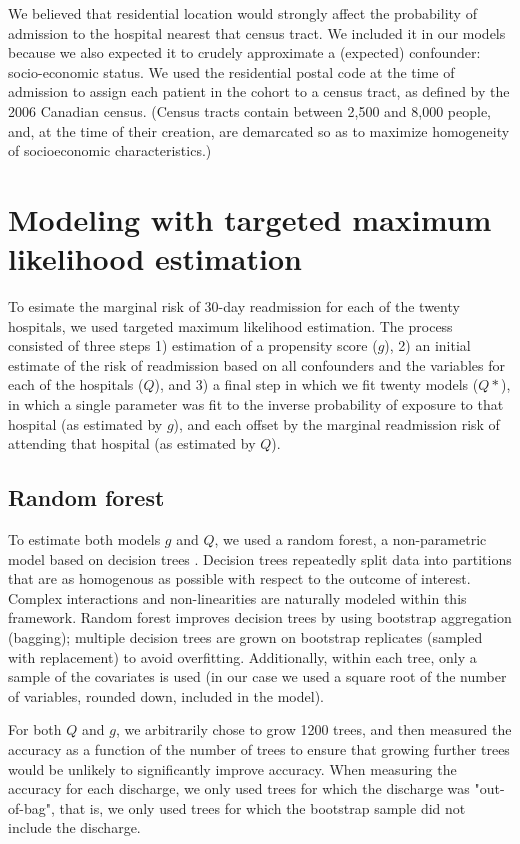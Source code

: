 \documentclass[]{article}\usepackage[]{graphicx}\usepackage[]{color}
\begin{document}
We believed that residential location would strongly affect the probability of admission to the hospital nearest that census tract. We included it in our models because we also expected it to crudely approximate a (expected) confounder: socio-economic status.  We used the residential postal code at the time of admission to assign each patient in the cohort to a census tract, as defined by the 2006 Canadian census. (Census tracts contain between 2,500 and 8,000 people, and, at the time of their creation, are demarcated so as to maximize homogeneity of socioeconomic characteristics.)

\section{Modeling with targeted maximum likelihood estimation}
To esimate the marginal risk of 30-day readmission for each of the twenty hospitals, we used targeted maximum likelihood estimation. The process consisted of three steps 1) estimation of a propensity score ($g$), 2) an initial estimate of the risk of readmission based on all confounders and the variables for each of the hospitals ($Q$), and 3) a final step in which we fit twenty models ($Q*$), in which a single parameter was fit to the inverse probability of exposure to that hospital (as estimated by $g$), and each offset by the marginal readmission risk of attending that hospital (as estimated by $Q$). 

\subsection{Random forest}
To estimate both models $g$ and $Q$, we used a random forest, a non-parametric model based on decision trees \supercite{breiman_random_2001}. Decision trees repeatedly split data into partitions that are as homogenous as possible with respect to the outcome of interest. Complex interactions and non-linearities are naturally modeled within this framework. Random forest improves decision trees by using bootstrap aggregation (bagging); multiple decision trees are grown on bootstrap replicates (sampled with replacement) to avoid overfitting. Additionally, within each tree, only a sample of the covariates is used (in our case we used a square root of the number of variables, rounded down, included in the model).

For both $Q$ and $g$, we arbitrarily chose to grow 1200 trees, and then measured the accuracy as a function of the number of trees to ensure that growing further trees would be unlikely to significantly improve accuracy. When measuring the accuracy for each discharge, we only used trees for which the discharge was "out-of-bag", that is, we only used trees for which the bootstrap sample did not include the discharge.
\end{document}

